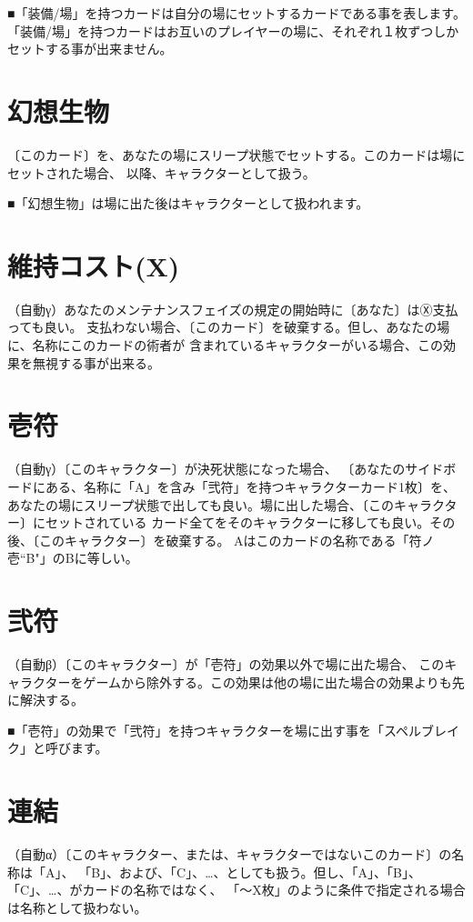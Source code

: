 \documentclass[fontsize=9pt,twocolumn,hanging_punctuation]{jlreq}
\begin{document}
■「装備/場」を持つカードは自分の場にセットするカードである事を表します。
「装備/場」を持つカードはお互いのプレイヤーの場に、それぞれ１枚ずつしかセットする事が出来ません。

\section*{幻想生物}
〔このカード〕を、あなたの場にスリープ状態でセットする。このカードは場にセットされた場合、
以降、キャラクターとして扱う。

■「幻想生物」は場に出た後はキャラクターとして扱われます。

\section*{維持コスト(X)}
（自動γ）あなたのメンテナンスフェイズの規定の開始時に〔あなた〕はⓍ支払っても良い。
支払わない場合、〔このカード〕を破棄する。但し、あなたの場に、名称にこのカードの術者が
含まれているキャラクターがいる場合、この効果を無視する事が出来る。

\section*{壱符}
（自動γ）〔このキャラクター〕が決死状態になった場合、
〔あなたのサイドボードにある、名称に「A」を含み「弐符」を持つキャラクターカード1枚〕を、
あなたの場にスリープ状態で出しても良い。場に出した場合、〔このキャラクター〕にセットされている
カード全てをそのキャラクターに移しても良い。その後、〔このキャラクター〕を破棄する。
Aはこのカードの名称である「符ノ壱``B"」のBに等しい。

\section*{弐符}
（自動β）〔このキャラクター〕が「壱符」の効果以外で場に出た場合、
このキャラクターをゲームから除外する。この効果は他の場に出た場合の効果よりも先に解決する。

■「壱符」の効果で「弐符」を持つキャラクターを場に出す事を「スペルブレイク」と呼びます。

\pagebreak
\section*{連結}
（自動α）〔このキャラクター、または、キャラクターではないこのカード〕の名称は「A」、
「B」、および、「C」、…、としても扱う。但し、「A」、「B」、「C」、…、がカードの名称ではなく、
「～X枚」のように条件で指定される場合は名称として扱わない。
\end{document}
